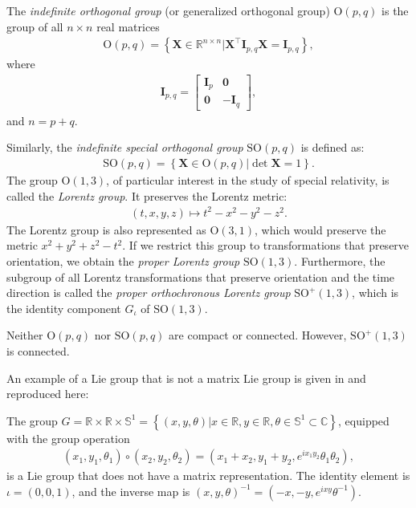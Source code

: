 \begin{example}
    The \emph{indefinite orthogonal group} (or generalized orthogonal group) $\text{O}(p,q)$ is the group of all $n\times n$ real matrices
    \begin{align}
        \text{O}(p,q) = \left\{\mathbf{X}\in\mathbb{R}^{n\times n} | \mathbf{X}^\top\mathbf{I}_{p,q}\mathbf{X} = \mathbf{I}_{p,q}\right\},
    \end{align}
    where
    \begin{align}
        \mathbf{I}_{p,q} = \begin{bmatrix}
            \mathbf{I}_p & \mathbf{0}\\
            \mathbf{0} & -\mathbf{I}_q
        \end{bmatrix},
    \end{align}
    and $n=p+q$.

    Similarly, the \emph{indefinite special orthogonal group} $\text{SO}(p,q)$ is defined as:
    \begin{align}
        \text{SO}(p, q) = \left\{\mathbf{X}\in\text{O}(p, q) | \det\mathbf{X}=1\right\}.
    \end{align}
    The group $\text{O}(1,3)$, of particular interest in the study of special relativity, is called the \emph{Lorentz group}. It preserves the Lorentz metric:
    \begin{align}
        (t,x,y,z) \mapsto t^2 - x^2 - y^2 - z^2.
    \end{align}
    The Lorentz group is also represented as $\text{O}(3,1)$, which would preserve the metric $x^2 + y^2 + z^2 - t^2$. If we restrict this group to transformations that preserve orientation, we obtain the \emph{proper Lorentz group} $\text{SO}(1,3)$. Furthermore, the subgroup of all Lorentz transformations that preserve orientation and the time direction is called the  \emph{proper orthochronous Lorentz group} $\text{SO}^+(1,3)$, which is the identity component $G_\iota$ of $\text{SO}(1,3)$.
    
    Neither $\text{O}(p,q)$ nor $\text{SO}(p,q)$ are compact or connected. However, $\text{SO}^+(1,3)$ is connected.
\end{example}
\begin{example}\label{ex:non-matrix-lie-group}
    An example of a Lie group that is not a matrix Lie group is given in \citet[p. 25]{Hall2015} and reproduced here:

    The group $G = \mathbb{R} \times \mathbb{R} \times \mathbb{S}^1 = \left\{(x, y, \theta) | x \in \mathbb{R}, y \in \mathbb{R}, \theta \in \mathbb{S}^1\subset\mathbb{C}\right\}$, equipped with the group operation
    \begin{align}
        (x_1, y_1, \theta_1)\circ (x_2, y_2, \theta_2) = (x_1 + x_2, y_1 + y_2, e^{ix_1y_2}\theta_1\theta_2),
    \end{align}
    is a Lie group that does not have a matrix representation. The identity element is $\iota=(0, 0, 1)$, and the inverse map is $(x, y, \theta)^{-1} = (-x, -y, e^{ixy}\theta^{-1})$.
\end{example} 

